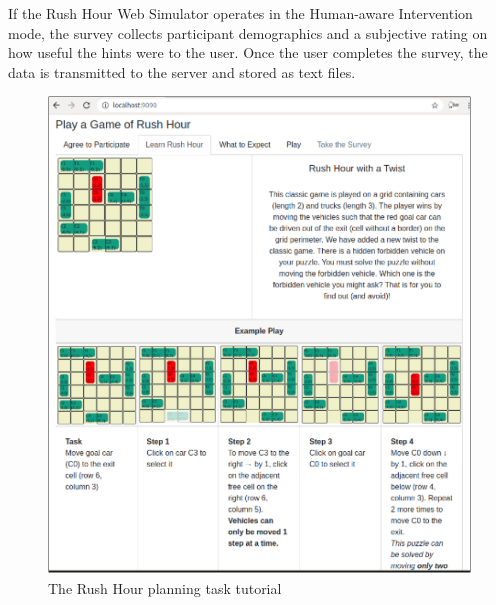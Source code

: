 If the Rush Hour Web Simulator operates in the Human-aware Intervention mode, the survey collects participant demographics and a subjective rating on how useful the hints were to the user.
Once the user completes the survey, the data is transmitted to the server and stored as text files.
\begin{figure}[tpb]
  \centering
\includegraphics[width=\columnwidth]{img/UI1.pdf}
  \caption{The Rush Hour planning task tutorial}
  \label{fig:ui1}
\end{figure}

